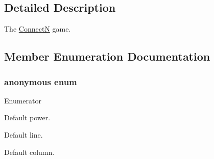 \subsection{Detailed Description}
The \hyperlink{classConnectN}{Connect\+N} game. 

\subsection{Member Enumeration Documentation}
\hypertarget{classConnectN_afbc5b3f1ce192977e53400984d532d1b}{\subsubsection[{anonymous enum}]{\setlength{\rightskip}{0pt plus 5cm}anonymous enum}}\label{classConnectN_afbc5b3f1ce192977e53400984d532d1b}
\begin{Desc}
\item[Enumerator]\par
\begin{description}
\item[{\em 
\hypertarget{classConnectN_afbc5b3f1ce192977e53400984d532d1ba8dabbd51219a23e08073e6c946755bc8}{D\+E\+F\+A\+U\+L\+T\+\_\+\+P\+O\+W\+E\+R}\label{classConnectN_afbc5b3f1ce192977e53400984d532d1ba8dabbd51219a23e08073e6c946755bc8}
}]Default power. \item[{\em 
\hypertarget{classConnectN_afbc5b3f1ce192977e53400984d532d1bae24544d9408db101c664328a5c00137c}{D\+E\+F\+A\+U\+L\+T\+\_\+\+L\+I\+N\+E}\label{classConnectN_afbc5b3f1ce192977e53400984d532d1bae24544d9408db101c664328a5c00137c}
}]Default line. \item[{\em 
\hypertarget{classConnectN_afbc5b3f1ce192977e53400984d532d1ba1ebbe9aa1e009f66a6c5c022f5ee0e50}{D\+E\+F\+A\+U\+L\+T\+\_\+\+C\+O\+L\+U\+M\+N}\label{classConnectN_afbc5b3f1ce192977e53400984d532d1ba1ebbe9aa1e009f66a6c5c022f5ee0e50}
}]Default column. \end{description}
\end{Desc}


